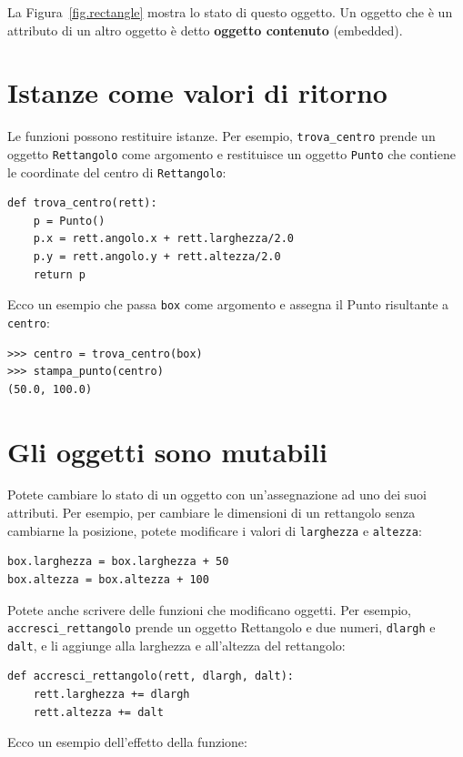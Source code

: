 \documentclass[10pt]{book}
\begin{document}
La Figura~\ref{fig.rectangle} mostra lo stato di questo oggetto.
Un oggetto che è un attributo di un altro oggetto è detto {\bf oggetto contenuto} (embedded).


\section{Istanze come valori di ritorno}

Le funzioni possono restituire istanze. Per esempio, \verb"trova_centro"
prende un oggetto {\tt Rettangolo} come argomento e restituisce un oggetto {\tt Punto} che contiene le coordinate del centro di {\tt Rettangolo}:

\begin{verbatim}
def trova_centro(rett):
    p = Punto()
    p.x = rett.angolo.x + rett.larghezza/2.0
    p.y = rett.angolo.y + rett.altezza/2.0
    return p
\end{verbatim}
%
Ecco un esempio che passa {\tt box} come argomento e assegna il Punto risultante a {\tt centro}:

\begin{verbatim}
>>> centro = trova_centro(box)
>>> stampa_punto(centro)
(50.0, 100.0)
\end{verbatim}
%

\section{Gli oggetti sono mutabili}

Potete cambiare lo stato di un oggetto con un'assegnazione ad uno dei suoi attributi. Per esempio, per cambiare le dimensioni di un rettangolo senza cambiarne la posizione, potete modificare i valori di {\tt larghezza} e {\tt altezza}:

\begin{verbatim}
box.larghezza = box.larghezza + 50
box.altezza = box.altezza + 100
\end{verbatim}
%
Potete anche scrivere delle funzioni che modificano oggetti. Per esempio,
\verb"accresci_rettangolo" prende un oggetto Rettangolo e due numeri,
{\tt dlargh} e {\tt dalt}, e li aggiunge alla larghezza e all'altezza del rettangolo:

\begin{verbatim}
def accresci_rettangolo(rett, dlargh, dalt):
    rett.larghezza += dlargh
    rett.altezza += dalt
\end{verbatim}
%
Ecco un esempio dell'effetto della funzione:
\end{document}
